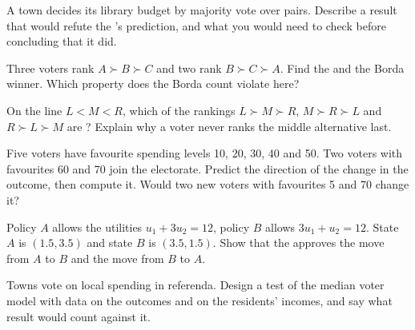 \begin{exercise}[$\star$]\label{exo:b2:social-choice:4}
A town decides its library budget by majority vote over pairs. Describe a result that would refute the
's prediction, and what you would need to check before concluding that it did.
\end{exercise}

\begin{exercise}[$\star\star$]\label{exo:b2:social-choice:5}
Three voters rank $A \succ B \succ C$ and two rank $B \succ C \succ A$. Find the  and the Borda
winner. Which property does the Borda count violate here?
\end{exercise}

\begin{exercise}[$\star\star$]\label{exo:b2:social-choice:6}
On the line $L < M < R$, which of the rankings $L \succ M \succ R$, $M \succ R \succ L$ and $R \succ L \succ M$ are
? Explain why a  voter never ranks the middle alternative last.
\end{exercise}

\begin{exercise}[$\star\star$]\label{exo:b2:social-choice:7}
Five voters have favourite spending levels 10, 20, 30, 40 and 50. Two voters with favourites 60 and 70 join
the electorate. Predict the direction of the change in the outcome, then compute it. Would two new voters
with favourites 5 and 70 change it?
\end{exercise}

\begin{exercise}[$\star\star$]\label{exo:b2:social-choice:8}
Policy $A$ allows the utilities $u_1 + 3u_2 = 12$, policy $B$ allows $3u_1 + u_2 = 12$. State $A$ is $(1.5, 3.5)$
and state $B$ is $(3.5, 1.5)$. Show that the  approves the move from $A$ to $B$ and the move from $B$
to $A$.
\end{exercise}

\begin{exercise}[$\star\star$]\label{exo:b2:social-choice:9}
Towns vote on local spending in referenda. Design a test of the median voter model with data on the
outcomes and on the residents' incomes, and say what result would count against it.
\end{exercise}

